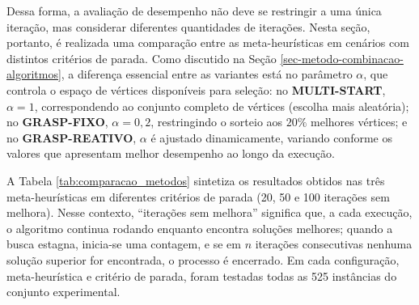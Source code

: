 Dessa forma, a avaliação de desempenho não deve se restringir a uma única iteração, mas considerar diferentes quantidades de iterações. Nesta seção, portanto, é realizada uma comparação entre as meta-heurísticas em cenários com distintos critérios de parada. Como discutido na Seção \ref{sec-metodo-combinacao-algoritmos}, a diferença essencial entre as variantes está no parâmetro $\alpha$, que controla o espaço de vértices disponíveis para seleção: no \textbf{MULTI-START}, $\alpha = 1$, correspondendo ao conjunto completo de vértices (escolha mais aleatória); no \textbf{GRASP-FIXO}, $\alpha = 0{,}2$, restringindo o sorteio aos $20\%$ melhores vértices; e no \textbf{GRASP-REATIVO}, $\alpha$ é ajustado dinamicamente, variando conforme os valores que apresentam melhor desempenho ao longo da execução.

A Tabela \ref{tab:comparacao_metodos} sintetiza os resultados obtidos nas três meta-heurísticas em diferentes critérios de parada (20, 50 e 100 iterações sem melhora). Nesse contexto, “iterações sem melhora” significa que, a cada execução, o algoritmo continua rodando enquanto encontra soluções melhores; quando a busca estagna, inicia-se uma contagem, e se em $n$ iterações consecutivas nenhuma solução superior for encontrada, o processo é encerrado. Em cada configuração, meta-heurística e critério de parada, foram testadas todas as 525 instâncias do conjunto experimental.

